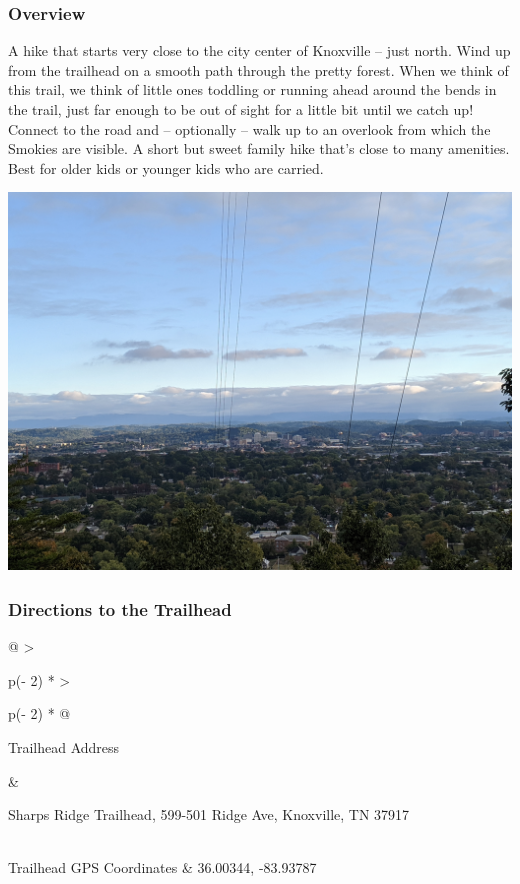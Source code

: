 \documentclass[
  letterpaper,
  DIV=11,
  numbers=noendperiod]{scrartcl}
\begin{document}
\hypertarget{overview-9}{%
\subsubsection{Overview}\label{overview-9}}

A hike that starts very close to the city center of Knoxville -- just
north. Wind up from the trailhead on a smooth path through the pretty
forest. When we think of this trail, we think of little ones toddling or
running ahead around the bends in the trail, just far enough to be out
of sight for a little bit until we catch up! Connect to the road and --
optionally -- walk up to an overlook from which the Smokies are visible.
A short but sweet family hike that's close to many amenities. Best for
older kids or younger kids who are carried.

\includegraphics{img/trail-10-figure-01.jpg}

\hypertarget{directions-to-the-trailhead-9}{%
\subsubsection{Directions to the
Trailhead}\label{directions-to-the-trailhead-9}}

\begin{longtable}[]{@{}
  >{\raggedright\arraybackslash}p{(\columnwidth - 2\tabcolsep) * }
  >{\raggedright\arraybackslash}p{(\columnwidth - 2\tabcolsep) * }@{}}
\toprule\noalign{}
\begin{minipage}[b]{\linewidth}\raggedright
Trailhead Address
\end{minipage} & \begin{minipage}[b]{\linewidth}\raggedright
Sharps Ridge Trailhead, 599-501 Ridge Ave, Knoxville, TN 37917
\end{minipage} \\
\midrule\noalign{}
\endhead
\bottomrule\noalign{}
\endlastfoot
Trailhead GPS Coordinates & 36.00344, -83.93787 \\
\end{longtable}
\end{document}
